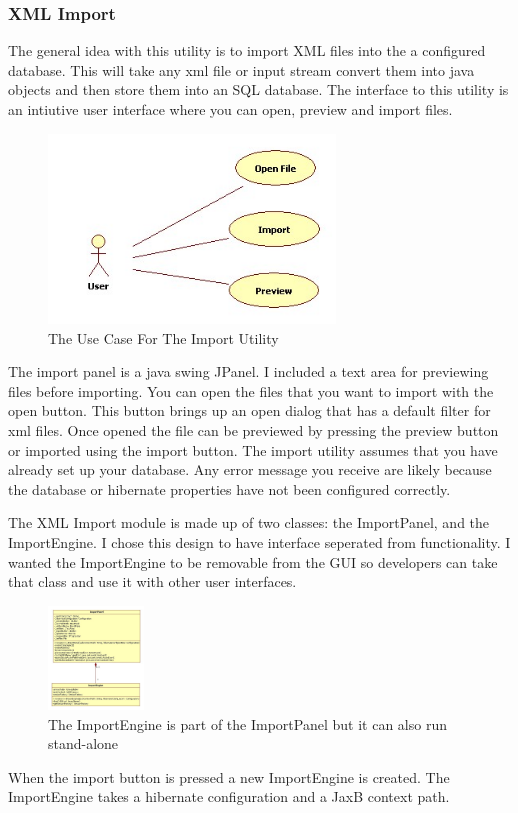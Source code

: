 \subsubsection{XML Import}
\par
The general idea with this utility is to import XML files into the a configured database. This will take any xml file or input stream convert them into java objects and then store them into an SQL database. The interface to this utility is an intiutive user interface where you can open, preview and import files. 

\begin{figure}[h]
	\centering
		\includegraphics[width=3.00in]{Images/ImportUse.jpg}
	\caption{The Use Case For The Import Utility}
	\label{fig:Import Use}
\end{figure}
\par
The import panel is a java swing JPanel. I included a text area for previewing files before importing. You can open the files that you want to import with the open button. This button brings up an open dialog that has a default filter for xml files. Once opened the file can be previewed by pressing the preview button or imported using the import button. The import utility assumes that you have already set up your database. Any error message you receive are likely because the database or hibernate properties have not been configured correctly. 


\par
The XML Import module is made up of two classes: the ImportPanel, and the ImportEngine. I chose this design to have interface seperated from functionality. I wanted the ImportEngine to be removable from the GUI so developers can take that class and use it with other user interfaces. 

\begin{figure}[h]
	\centering
		\includegraphics[width=1.00in]{Images/ImportClasses.jpg}
	\caption{The ImportEngine is part of the ImportPanel but it can also run stand-alone}
	\label{fig:ImportClasses}
\end{figure}

When the import button is pressed a new ImportEngine is created. The ImportEngine takes a hibernate configuration and a JaxB context path. 

